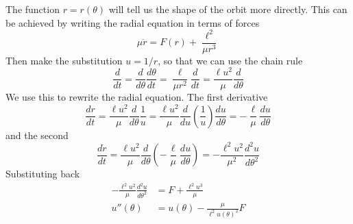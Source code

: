\documentclass[../../../main.tex]{subfiles}
\begin{document}
The function $r = r (\theta)$ will tell us the shape of the orbit more directly.
This can be achieved by writing the radial equation in terms of forces
\begin{equation*}
    \mu \ddot{r}=F(r)+\frac{\ell^2 }{\mu r^3}
\end{equation*}
Then make the substitution $u=1/r$, so that we can use the chain rule
\begin{equation*}
    \frac{d }{dt}=
    \frac{d }{d\theta}\frac{d\theta }{dt}=
    \frac{\ell}{\mu r^2}\frac{d }{dt}=
    \frac{\ell u^2}{\mu}\frac{d   }{d\theta}
\end{equation*}
We use this to rewrite the radial equation.
The first derivative
\begin{equation*}
    \frac{dr }{dt}=
    \frac{\ell u^2}{\mu}\frac{d   }{d\theta}\frac{1 }{u}=
    \frac{\ell u^2}{\mu}\frac{d   }{du}\left(\frac{1 }{u}\right)\frac{du }{d\theta}=
    -\frac{\ell }{\mu}\frac{du }{d\theta}
\end{equation*}
and the second
\begin{equation*}
    \frac{d \dot{r}}{dt}=
    \frac{\ell u^2}{\mu}\frac{d   }{d\theta}\left(     -\frac{\ell }{\mu}\frac{du }{d\theta} \right)=
    -\frac{\ell^2u^2 }{\mu^2}\frac{d^2u }{d\theta^2}
\end{equation*}
Substituting back 
\begin{align*}
    -\frac{\ell^2u^2 }{\mu}\frac{d^2u }{d\theta^2}&= F+ \frac{\ell^2u^3 }{\mu}\\
    u''(\theta)&=  u(\theta)-\frac{\mu }{\ell^2 u(\theta)^2}F
\end{align*}
\end{document}
